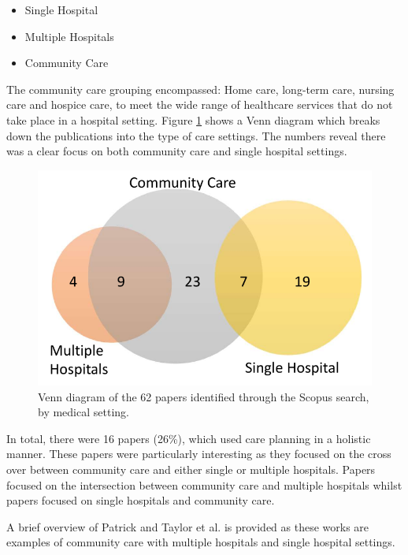 \documentclass[../thesis.tex]{subfiles}
\begin{document}
\begin{itemize}
    \item Single Hospital
    \item Multiple Hospitals
    \item Community Care
\end{itemize}

The community care grouping encompassed: Home care, long-term care, nursing care and hospice care, to meet the wide range of healthcare services that do not take place in a hospital setting.
Figure \ref{fig:VennDiag} shows a Venn diagram which breaks down the publications into the type of care settings. The numbers reveal there was a clear focus on both community care and single hospital settings.

\begin{figure}[h!]
\centering
  \includegraphics[scale=0.75]{Chapter2/Figures/Venn2.pdf}
\caption{Venn diagram of the 62 papers identified through the Scopus search, by medical setting.}
\label{fig:VennDiag}  
\end{figure}


In total, there were 16 papers (26\%), which used care planning in a holistic manner. These papers were particularly interesting as they focused on the cross over between community care and either single or multiple hospitals. Papers \cite{Davari, Intrevado, Johnson, Lim,McClean,Patrick,Ragab, Walker, Zychlinski} focused on the intersection between community care and multiple hospitals whilst papers \cite{Faddy,Garg1,Garg2, Gordon1,Gordon2, Hare, Taylor} focused on single hospitals and community care.

A brief overview of Patrick \cite{Patrick} and Taylor et al. \cite{Taylor} is provided as these works are examples of community care with multiple hospitals and single hospital settings. 
\end{document}
